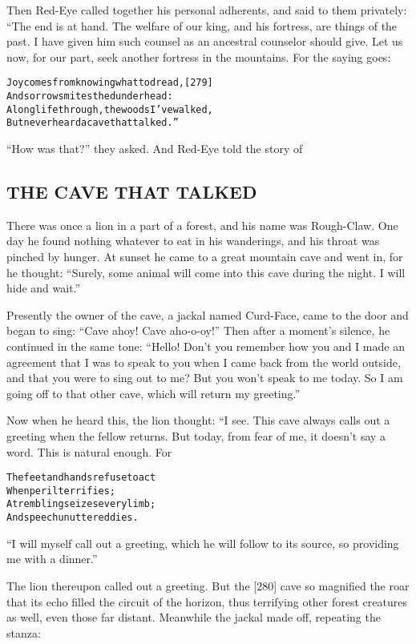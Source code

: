 \documentclass{article}
\renewenvironment{verbatim}{\begin{alltt}\normalfont\begin{centering}}{\end{centering}\end{alltt}}
\begin{document}
Then Red-Eye called together his personal adherents, and said to
them privately: “The end is at hand. The welfare of our king, and
his fortress, are things of the past. I have given him such counsel
as an ancestral counselor should give. Let us now, for our part,
seek another fortress in the mountains. For the saying goes:

\begin{verbatim}
Joy comes from knowing what to dread,                   [279]
And sorrow smites the dunderhead:
A long life through, the woods I've walked,
But never heard a cave that talked.”
\end{verbatim}
``How was that?'' they asked. And Red-Eye told the story of

\subsection{THE CAVE THAT TALKED}

There was once a lion in a part of a forest, and his name was
Rough-Claw. One day he found nothing whatever to eat in his
wanderings, and his throat was pinched by hunger. At sunset he came
to a great mountain cave and went in, for he thought:
``Surely, some animal will come into this cave during the night. I will hide and wait.''

Presently the owner of the cave, a jackal named Curd-Face, came to
the door and began to sing: ``Cave ahoy! Cave aho-o-oy!'' Then
after a moment's silence, he continued in the same tone:
``Hello! Don't you remember how you and I made an agreement that I was to speak to you when I came back from the world outside, and that you were to sing out to me? But you won't speak to me today. So I am going off to that other cave, which will return my greeting.''

Now when he heard this, the lion thought: “I see. This cave always
calls out a greeting when the fellow returns. But today, from fear
of me, it doesn't say a word. This is natural enough. For

\begin{verbatim}
The feet and hands refuse to act
    When peril terrifies;
A trembling seizes every limb;
    And speech unuttered dies.
\end{verbatim}
``I will myself call out a greeting, which he will follow to its source, so providing me with a dinner.''

The lion thereupon called out a greeting. But the [280] cave so
magnified the roar that its echo filled the circuit of the horizon,
thus terrifying other forest creatures as well, even those far
distant. Meanwhile the jackal made off, repeating the stanza:
\end{document}
